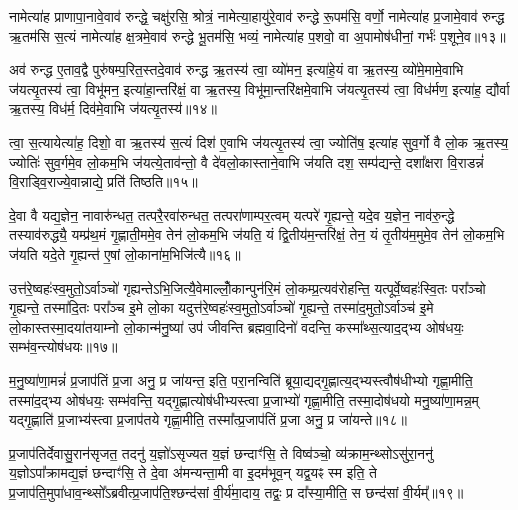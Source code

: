 नामेत्या॑ह प्राणापा॒नावे॒वाव॑ रुन्द्धे॒ चक्षु॑रसि॒ श्रोत्रं॒ नामेत्या॒हायु॑रे॒वाव॑ रुन्द्धे रू॒पम॑सि॒ वर्णो॒ नामेत्या॑ह प्र॒जामे॒वाव॑ रुन्द्ध ऋ॒तम॑सि स॒त्यं नामेत्या॑ह क्ष॒त्रमे॒वाव॑ रुन्द्धे भू॒तम॑सि॒ भव्यं॒ नामेत्या॑ह प॒शवो॒ वा अ॒पामोष॑धीनां॒ गर्भः॑ प॒शूने॒व॥१३॥

अव॑ रुन्द्ध ए॒ताव॒द्वै पुरु॑षम्प॒रित॒स्तदे॒वाव॑ रुन्द्ध ऋ॒तस्य॑ त्वा॒ व्यो॑मन॒ इत्या॑हे॒यं वा ऋ॒तस्य॒ व्यो॑मे॒मामे॒वाभि ज॑यत्यृ॒तस्य॑ त्वा॒ विभू॑मन॒ इत्या॑हा॒न्तरि॑क्षं॒ वा ऋ॒तस्य॒ विभू॑मा॒न्तरि॑क्षमे॒वाभि ज॑यत्यृ॒तस्य॑ त्वा॒ विध॑र्मण॒ इत्या॑ह॒ द्यौर्वा ऋ॒तस्य॒ विध॑र्म॒ दिव॑मे॒वाभि ज॑यत्यृ॒तस्य॑॥१४॥

त्वा॒ स॒त्यायेत्या॑ह॒ दिशो॒ वा ऋ॒तस्य॑ स॒त्यं दिश॑ ए॒वाभि ज॑यत्यृ॒तस्य॑ त्वा॒ ज्योति॑ष॒ इत्या॑ह सुव॒र्गो वै लो॒क ऋ॒तस्य॒ ज्योतिः॑ सुव॒र्गमे॒व लो॒कम॒भि ज॑यत्ये॒ताव॑न्तो॒ वै दे॑वलो॒कास्ताने॒वाभि ज॑यति दश॒ सम्प॑द्यन्ते॒ दशा᳚क्षरा वि॒राडन्नं॑ वि॒राड्वि॒राज्ये॒वान्नाद्ये॒ प्रति॑ तिष्ठति॥१५॥

{\anuvakamend[{व्यो॑मन ऋ॒तस्य॑ प्रा॒णः प॒शूने॒व विध॑र्म॒ दिव॑मे॒वाभि ज॑यत्यृ॒तस्य॒ षट्च॑त्वारिꣳशच्च॥५॥}]}

दे॒वा वै यद्य॒ज्ञेन॒ नावारु॑न्धत॒ तत्परै॒रवा॑रुन्धत॒ तत्परा॑णाम्पर॒त्वम् यत्परे॑ गृ॒ह्यन्ते॒ यदे॒व य॒ज्ञेन॒ नाव॑रु॒न्द्धे तस्याव॑रुद्ध्यै॒ यम्प्र॑थ॒मं गृ॒ह्णाती॒ममे॒व तेन॑ लो॒कम॒भि ज॑यति॒ यं द्वि॒तीय॑म॒न्तरि॑क्षं॒ तेन॒ यं तृ॒तीय॑म॒मुमे॒व तेन॑ लो॒कम॒भि ज॑यति यदे॒ते गृ॒ह्यन्त॑ ए॒षां लो॒काना॑म॒भिजि॑त्यै॥१६॥

उत्त॑रे॒ष्वहः॑स्व॒मुतो॒\-ऽर्वाञ्चो॑ गृह्यन्ते\-ऽभि॒जित्यै॒वेमाल्लोँ॒कान्पुन॑रि॒मं लो॒कम्प्र॒त्यव॑रोहन्ति॒ यत्पूर्वे॒ष्वहः॑स्वि॒तः परा᳚ञ्चो गृ॒ह्यन्ते॒ तस्मा॑दि॒तः परा᳚ञ्च इ॒मे लो॒का यदुत्त॑रे॒ष्वहः॑स्व॒मुतो॒\-ऽर्वाञ्चो॑ गृ॒ह्यन्ते॒ तस्मा॑द॒मुतो॒\-ऽर्वाञ्च॑ इ॒मे लो॒कास्तस्मा॒द\-या॑तयाम्नो लो॒कान्म॑नु॒ष्या॑ उप॑ जीवन्ति ब्रह्मवा॒दिनो॑ वदन्ति॒ कस्मा᳚थ्स॒त्याद॒द्भ्य ओष॑धयः॒ सम्भ॑व॒न्त्योष॑धयः॥१७॥

म॒नु॒ष्या॑णा॒मन्नं॑ प्र॒जाप॑तिं प्र॒जा अनु॒ प्र जा॑यन्त॒ इति॒ परा॒नन्विति॑ ब्रूया॒द्यद्गृ॒ह्णात्य॒द्भ्यस्त्वौष॑धीभ्यो गृह्णा॒मीति॒ तस्मा॑द॒द्भ्य ओष॑धयः॒ सम्भ॑वन्ति॒ यद्गृ॒ह्णात्योष॑धीभ्यस्त्वा प्र॒जाभ्यो॑ गृह्णा॒मीति॒ तस्मा॒दोष॑धयो मनु॒ष्या॑णा॒मन्न॒म् यद्गृ॒ह्णाति॑ प्र॒जाभ्य॑स्त्वा प्र॒जाप॑तये गृह्णा॒मीति॒ तस्मा᳚त्प्र॒जाप॑तिं प्र॒जा अनु॒ प्र जा॑यन्ते॥१८॥

{\anuvakamend[{अ॒भिजि॑त्या॒ ओष॑धयो॒\-ऽष्टाच॑त्वारिꣳशच्च॥६॥}]}

प्र॒जाप॑तिर्देवासु॒रान॑सृजत॒ तदनु॑ य॒ज्ञो॑\-ऽसृज्यत य॒ज्ञं छन्दाꣳ॑सि॒ ते विष्व॑ञ्चो॒ व्य॑क्राम॒न्थ्सो\-ऽसु॑रा॒ननु॑ य॒ज्ञो\-ऽपा᳚क्रामद्य॒ज्ञं छन्दाꣳ॑सि॒ ते दे॒वा अ॑मन्यन्ता॒मी वा इ॒दम॑भूव॒न् यद्व॒यꣴ स्म इति॒ ते प्र॒जाप॑ति॒मुपा॑धाव॒न्थ्सो᳚\-ऽब्रवीत्प्र॒जाप॑ति॒श्छन्द॑सां वी॒र्य॑मा॒दाय॒ तद्वः॒ प्र दा᳚स्या॒मीति॒ स छन्द॑सां वी॒र्यम्᳚॥१९॥

